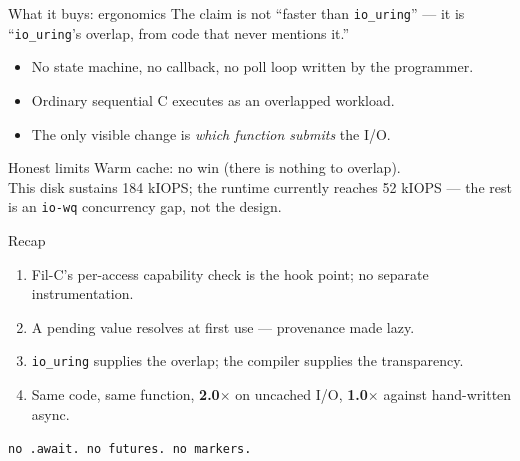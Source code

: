 \documentclass[aspectratio=169]{beamer}
\begin{document}
\begin{frame}{What it buys: ergonomics}
  The claim is not ``faster than \texttt{io\_uring}'' --- it is ``\texttt{io\_uring}'s overlap, from code that never mentions it.''

  \begin{itemize}
    \item No state machine, no callback, no poll loop written by the programmer.
    \item Ordinary sequential C executes as an overlapped workload.
    \item The only visible change is \emph{which function submits} the I/O.
  \end{itemize}

  \vspace{4pt}
  \begin{block}{Honest limits}
    Warm cache: no win (there is nothing to overlap).\\
    This disk sustains 184 kIOPS; the runtime currently reaches 52 kIOPS --- the rest is an \texttt{io-wq} concurrency gap, not the design.
  \end{block}
\end{frame}

\begin{frame}{Recap}
  \begin{enumerate}
    \item Fil-C's per-access capability check is the hook point; no separate instrumentation.
    \item A pending value resolves at first use --- provenance made lazy.
    \item \texttt{io\_uring} supplies the overlap; the compiler supplies the transparency.
    \item Same code, same function, \textbf{2.0$\times$} on uncached I/O, \textbf{1.0$\times$} against hand-written async.
  \end{enumerate}

  \vspace{4pt}
  \centering
  \texttt{no .await. no futures. no markers.}
\end{frame}
\end{document}
